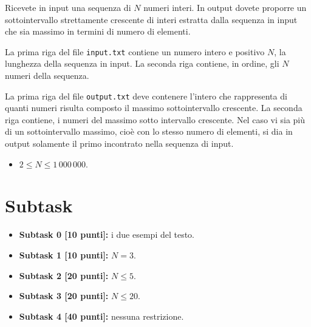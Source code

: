 \renewcommand{\nomebreve}{Trovare il massimo sottointervallo crescente}
\renewcommand{\titolo}{Max sottointervallo crescente}

\introduzione{}

Ricevete in input una sequenza di $N$ numeri interi.
In output dovete proporre un sottointervallo strettamente crescente di interi estratta dalla sequenza in input che sia massimo in termini di numero di elementi. 


La prima riga del file \verb'input.txt' contiene un numero intero e positivo $N$, la lunghezza della sequenza in input.
La seconda riga contiene, in ordine, gli $N$ numeri della sequenza.

La prima riga del file \verb'output.txt' deve contenere l'intero che rappresenta di quanti numeri risulta composto il massimo sottointervallo crescente.
La seconda riga contiene, i numeri del massimo sotto intervallo crescente.
Nel caso vi sia più di un sottointervallo massimo, cioè con lo stesso numero di elementi, si dia in output solamente il primo incontrato nella sequenza di input.


\begin{itemize}[nolistsep, noitemsep]
  \item $2 \le N \le 1\,000\,000$.
\end{itemize}
  
  \section*{Subtask}
  \begin{itemize}
    \item \textbf{Subtask 0 [10 punti]:} i due esempi del testo.
    \item \textbf{Subtask 1 [10 punti]:} $N = 3$.
    \item \textbf{Subtask 2 [20 punti]:} $N \leq 5$.
    \item \textbf{Subtask 3 [20 punti]:} $N \leq 20$.
    \item \textbf{Subtask 4 [40 punti]:} nessuna restrizione.
  \end{itemize}
  
